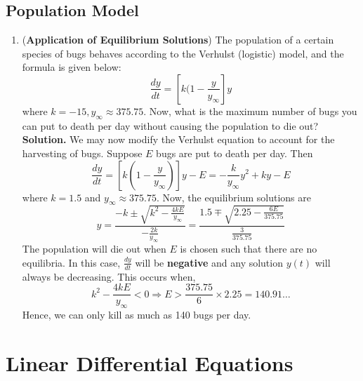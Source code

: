 \documentclass{article}
\begin{document}
\subsection{Population Model}
\begin{enumerate}
    \item (\textbf{Application of Equilibrium Solutions}) The population of a certain species of bugs behaves according to the Verhulst (logistic) model, and the formula is given below:
    \begin{equation}
        \frac{dy}{dt}=[k(1-\frac{y}{y_\infty}]y
    \end{equation}
    where $k=-15, y_{\infty}\approx375.75$. Now, what is the maximum number of bugs you can put to death per day without causing the population to die out? \newline
    \textbf{Solution.} We may now modify the Verhulst equation to account for the harvesting of bugs. Suppose $E$ bugs are put to death per day. Then
    \begin{equation*}
        \frac{dy}{dt}=[k(1-\frac{y}{y_{\infty}})]y-E=-\frac{k}{y_\infty}y^2+ky-E
    \end{equation*}
    where $k=1.5$ and $y_\infty\approx375.75$. Now, the equilibrium solutions are
    \begin{equation*}
        y=\frac{-k\pm\sqrt{k^2-\frac{4kE}{y_\infty}}}{-\frac{2k}{y_\infty}}=\frac{1.5\mp\sqrt{2.25-\frac{6E}{375.75}}}{\frac{3}{375.75}}
    \end{equation*}
    The population will die out when $E$ is chosen such that there are no equilibria. In this case, $\frac{dy}{dt}$ will be \textbf{negative} and any solution $y(t)$ will always be decreasing. This occurs when,
    \begin{equation*}
        k^2-\frac{4kE}{y_\infty}<0\Rightarrow E>\frac{375.75}{6}\times2.25=140.91\dots
    \end{equation*}
    Hence, we can only kill as much as 140 bugs per day.
\end{enumerate}
\newpage
\section{Linear Differential Equations}
\end{document}
